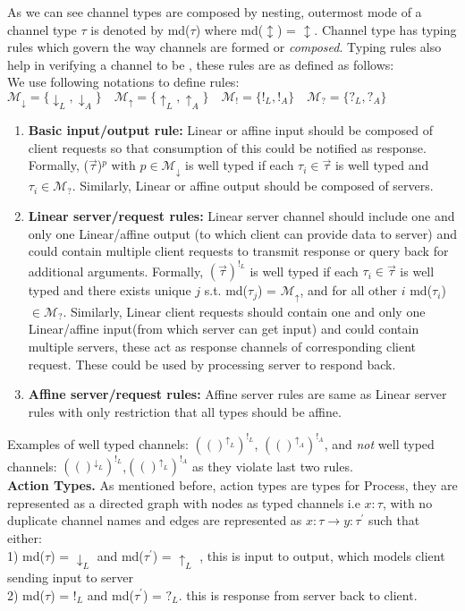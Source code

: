 \documentclass[11pt, pdftex]{article}
\begin{document}
As we can see channel types are composed by nesting, outermost mode of a channel type $\tau$ is denoted by md($\tau$) where md($\updownarrow$) = $\updownarrow$. Channel type has typing rules which govern the way channels are formed or \textit{composed}. Typing rules also help in verifying a channel to be , these rules are as defined as follows:\\
We use following notations to define rules:\\
$\mathcal{M_{\downarrow}} = \{\downarrow_{L},\downarrow_{A}\} \quad \mathcal{M_{\uparrow}} = \{\uparrow_{L},\uparrow_{A}\} \quad \mathcal{M_{!}} = \{!_{L},!_{A}\} \quad \mathcal{M_{?}} = \{?_{L},?_{A}\}$
\\
\begin{enumerate}
\item \textbf{Basic input/output rule:} Linear or affine input should be composed of client requests so that consumption of this could be notified as response. Formally, ($\overrightarrow{\tau}$)$^p$ with $p \in \mathcal{M_{\downarrow}}$ is well typed if each $\tau_{i} \in \overrightarrow{\tau}$ is well typed and $\tau_{i} \in \mathcal{M_{?}}$. Similarly, Linear or affine output should be composed of servers.
\item \textbf{Linear server/request rules:} Linear server channel should include one and only one Linear/affine output (to which client can provide data to server) and could contain multiple client requests to transmit response or query back for additional arguments. Formally, $(\overrightarrow{\tau})^{!_{L}}$ is well typed if each $\tau_{i} \in \overrightarrow{\tau}$ is well typed and there exists unique $j$ s.t. md($\tau_{j}$) = $\mathcal{M_{\uparrow}}$, and for all other $i$ md($\tau_{i}$) $\in  \mathcal{M_{?}}$. Similarly, Linear client requests should contain one and only one Linear/affine input(from which server can get input) and could contain multiple servers, these act as response channels of corresponding client request. These could be used by processing server to respond back.
\item \textbf{Affine server/request rules:} Affine server rules are same as Linear server rules with only restriction that all types should be affine.
\end{enumerate}
Examples of well typed channels: $(()^{\uparrow_{L}})^{!_{L}}$, $(()^{\uparrow_{A}})^{!_{A}}$, and \textit{not} well typed channels: $(()^{\downarrow_{L}})^{!_{L}}$,$(()^{\uparrow_{L}})^{!_{A}}$ as they violate last two rules.
\\
\textbf{Action Types.} As mentioned before, action types are types for Process, they are represented as a directed graph with nodes as typed channels i.e $x:\tau$, with no duplicate channel names and edges are represented as $x:\tau \rightarrow y:\tau^{\prime}$ such that either: \\
1) md($\tau$) = $\downarrow_{L}$ and md($\tau^{\prime}$) = $\uparrow_{L}$ , this is input to output, which models client sending input to server \\
2) md($\tau$) = $!_{L}$ and md($\tau^{\prime}$) = $?_{L}$. this is response from server back to client.\\
\end{document}
